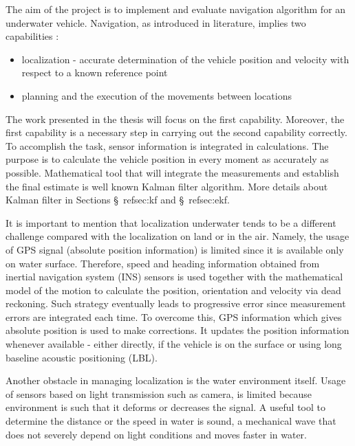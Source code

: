 The aim of the project is to implement and evaluate navigation algorithm for an underwater vehicle. Navigation, as introduced in literature, implies two capabilities \cite{farrell98}:
\begin{itemize}
\item localization - accurate determination of the vehicle position and velocity with respect to a known reference point
\item planning and the execution of the movements between locations   
\end{itemize} 
The work presented in the thesis will focus on the first capability. Moreover, the first capability is a necessary step in carrying out the second capability correctly. To accomplish the task, sensor information is integrated in calculations. The purpose is to calculate the vehicle position in every moment as accurately as possible. Mathematical tool that will integrate the measurements and establish the final estimate is well known Kalman filter \cite{kalman60} algorithm. More details about Kalman filter in Sections \S~ref{sec:kf} and \S~ref{sec:ekf}. 

It is important to mention that localization underwater tends to be a different challenge compared with the localization on land or in the air. Namely, the usage of GPS signal (absolute position information) is limited since it is available only on water surface. Therefore, speed and heading information obtained from inertial navigation system (INS) sensors is used together with the mathematical model of the motion to calculate the position, orientation and velocity via dead reckoning. Such strategy eventually leads to progressive error since measurement errors are integrated each time. To overcome this, GPS information which gives absolute position is used to make corrections. It updates the position information whenever available - either directly, if the vehicle is on the surface or using long baseline acoustic positioning (LBL).

Another obstacle in managing localization is the water environment itself. Usage of sensors based on light transmission such as camera, is limited because environment is such that it deforms or decreases the signal. A useful tool to determine the distance or the speed in water is sound, a mechanical wave that does not severely depend on light conditions and moves faster in water.  

